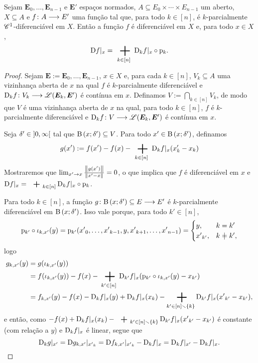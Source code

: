 \begin{proposition}
\label{prop:diferenciabilidade.parcial.continua.diferenciabilidade.pontual}
Sejam $\bm E_0, \ldots, \bm E_{n-1}$ e $\bm E'$ espaços normados, $A \subseteq E_0 \times \cdots \times E_{n-1}$ um aberto, $X \subseteq A$ e $f\colon \allowbreak A \longrightarrow E'$ uma função tal que, para todo $k \in [n]$, é $k$-parcialmente $\mathscr{C}^1$-diferenciável em $X$. Então a função $f$ é diferenciável em $X$ e, para todo $x \in X$,
	\begin{equation*}
	\D f|_x = \sum_{k \in [n]} \D_k f|_x \circ \proj_k.
	\end{equation*}
\end{proposition}
\begin{proof}
Sejam $\bm E := \bm E_0, \ldots, \bm E_{n-1}$, $x \in X$ e, para cada $k \in [n]$, $V_k \subseteq A$ uma vizinhança aberta de $x$ na qual $f$ é $k$-parcialmente diferenciável e $\mathrm{D}_k f\colon \allowbreak V_k \longrightarrow \mathscr{L}(\bm E_k, \bm E')$ é contínua em $x$. Definamos $V := \bigcap_{k \in [n]} V_k$, de modo que $V$ é uma vizinhança aberta de $x$ na qual, para todo $k \in [n]$, $f$ é $k$-parcialmente diferenciável e $\mathrm{D}_k f\colon \allowbreak V \longrightarrow \mathscr{L}(\bm E_k, \bm E')$ é contínua em $x$.

Seja $\delta' \in \left]0,\allowbreak \infty\right[$ tal que $\mathrm{B}\left(x; \delta'\right) \subseteq V$. Para todo $x' \in \mathrm{B}\left(x; \delta'\right)$, definamos
	\begin{equation*}
	g(x') := f(x') - f(x) - \sum_{k \in [n]} \D_k f|_x(x'_k - x_k)
	\end{equation*}
Mostraremos que $\lim_{x' \to x} \frac{\left\Vert{g(x')}\right\Vert}{\left\Vert{x'-x}\right\Vert} = 0$, o que implica que $f$ é diferenciável em $x$ e $\D f|_x = \sum_{k \in [n]} \D_k f|_x \circ \proj_k$.

Para todo $k \in [n]$, a função $g\colon \allowbreak \mathrm{B}\left(x; \delta'\right) \subseteq E \longrightarrow E'$ é $k$-parcialmente diferenciável em $\mathrm{B}\left(x; \delta'\right)$. Isso vale porque, para todo $k' \in [n]$,
	\begin{equation*}
	\proj_{k'} \circ \inclu_{k,x'}(y) = \proj_{k'}({x'}_0,\ldots,{x'}_{k-1},y,{x'}_{k+1},\ldots,{x'}_{n-1}) =
		\begin{cases}
		y,			& k = k' \\
		{x'}_{k'},	& k \neq k',
		\end{cases}
	\end{equation*}
logo
	\begin{align*}
	g_{k,x'}(y) &= g(\inclu_{k,x'}(y)) \\
		&= f(\inclu_{k,x'}(y)) - f(x) - \sum_{k' \in [n]} \D_{k'} f|_x(\proj_{k'} \circ \inclu_{k,x'}(y) - x_{k'}) \\
		&= f_{k,x'}(y) - f(x) - \D_k f|_x(y) + \D_k f|_x(x_k) - \sum_{k' \in [n] \setminus \{k\}} \D_{k'} f|_x({x'}_{k'} - x_{k'}),
	\end{align*}
e então, como $- f(x) + \D_k f|_x(x_k) - \sum_{k' \in [n] \setminus \{k\}} \D_{k'} f|_x({x'}_{k'} - x_{k'})$ é constante (com relação a $y$) e $\mathrm{D}_k f|_x$ é linear, segue que
	\begin{equation*}
	\mathrm{D}_k g|_{x'} = \mathrm{D} g_{k,x'}|_{{x'}_k} = \mathrm{D} f_{k,x'}|_{{x'}_k} - \mathrm{D}_k f|_x = \mathrm{D}_k f|_{x'} - \mathrm{D}_k f|_x.
	\end{equation*}


\end{proof}
